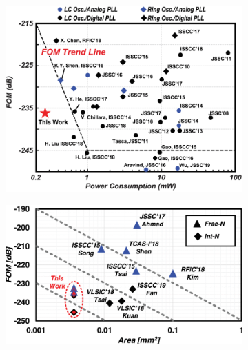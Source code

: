 	\begin{figure}[htb!]
	    \centering
	    \begin{subfigure}{0.5\textwidth}
	        \centering
	        \includegraphics[width=1\textwidth, angle=0]{./figs/liu24-fom}
	    \end{subfigure}%
	    \begin{subfigure}{0.5\textwidth}
	        \centering
	        \includegraphics[width=1\textwidth, angle=0]{./figs/liu_5nm}
	    \end{subfigure}
	\end{figure}



\pagebreak
